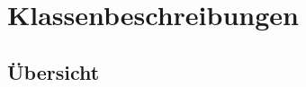 \section{Klassenbeschreibungen}


\subsection{Übersicht}

\newpage


\setlength\parsep{0pt}
\setlength\parskip{0pt}





\setlength\parsep\oldparsep
\setlength\parskip\oldparskip

\newpage